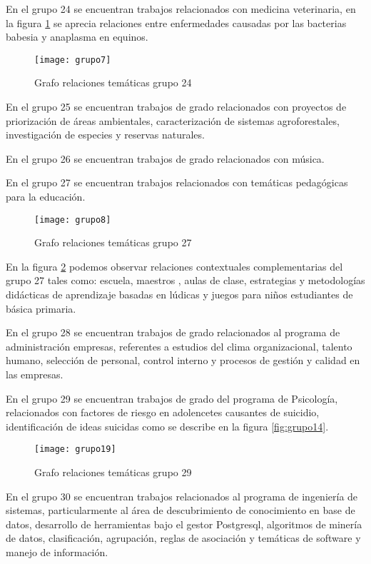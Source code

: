 En el grupo 24 se encuentran trabajos relacionados con medicina veterinaria, en la figura \ref{fig:grupo7} se aprecia relaciones entre enfermedades causadas por las bacterias babesia y  anaplasma en equinos.

\begin{figure}[H]\centering
\texttt{[image: grupo7]}
\caption{Grafo  relaciones temáticas grupo 24 }
\label{fig:grupo7}
\end{figure}

En el grupo 25 se encuentran trabajos de grado relacionados con proyectos de priorización de áreas ambientales, caracterización de sistemas agroforestales, investigación de especies y reservas naturales.  %

En el grupo 26 se encuentran trabajos de grado relacionados con música.

En el grupo 27 se encuentran trabajos relacionados con temáticas pedagógicas para la educación. 
\begin{figure}[H]\centering
\texttt{[image: grupo8]}
\caption{Grafo  relaciones temáticas grupo 27 }
\label{fig:grupo8}
\end{figure}

En la figura \ref{fig:grupo8} podemos observar relaciones contextuales complementarias del grupo 27 tales como: escuela, maestros , aulas de clase, estrategias y metodologías didácticas de aprendizaje basadas en lúdicas y juegos para niños estudiantes de básica  primaria.

En el grupo 28 se encuentran trabajos de grado relacionados al programa de administración empresas, referentes a estudios del clima organizacional, talento humano, selección de personal, control interno y procesos de gestión y calidad en las empresas.

En el grupo 29 se encuentran trabajos de grado del programa de Psicología, relacionados con factores de riesgo en adolencetes causantes de suicidio, identificación de ideas suicidas como se describe en la figura \ref{fig:grupo14}.
\begin{figure}[H]\centering
\texttt{[image: grupo19]}
\caption{Grafo  relaciones temáticas grupo 29 }
\label{fig:grupo19}
\end{figure}

En el grupo 30 se encuentran trabajos relacionados al programa de ingeniería de sistemas, particularmente al área de descubrimiento de conocimiento en base de datos, desarrollo de herramientas bajo el gestor Postgresql, algoritmos de minería de datos, clasificación, agrupación, reglas de asociación y temáticas de software y manejo de información.

